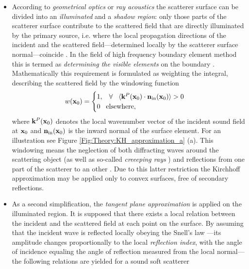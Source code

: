 \begin{itemize}
%
\item According to \emph{geometrical optics} or \emph{ray acoustics} the scatterer surface can be divided into an \emph{illuminated} and a \emph{shadow region}: only those parts of the scatterer surface contribute to the scattered field that are directly illuminated by the primary source, i.e. where the local propagation directions of the incident and the scattered field---determined locally by the scatterer surface normal---coincide \cite{doi:10.1121/1.1916538}.
In the field of high frequency boundary element method this is termed as \emph{determining the visible elements} on the boundary \cite{Herrin2003}.
Mathematically this requirement is formulated as weighting the integral, describing the scattered field by the windowing function
\begin{equation}
w(\mathbf{x}_0) = \begin{cases}
                        1, \hspace{3mm} \forall \hspace{3mm} \langle \mathbf{k}^P(\mathbf{x}_0) \cdot \mathbf{n}_{\mathrm{in}}(\mathbf{x}_0) \rangle > 0 \\
                        0  \hspace{3mm} \text{elsewhere},
                    \end{cases}
\label{eq:theory:windowing_function}
\end{equation}
where $\mathbf{k}^P(\mathbf{x}_0)$ denotes the local wavenumber vector of the incident sound field at $\mathbf{x}_0$ and $ \mathbf{n}_{\mathrm{in}}(\mathbf{x}_0)$ is the inward normal of the surface element. 
For an illustration see Figure \ref{Fig:Theory:KH_approximation_a} (a).
%
This windowing means the neglection of both diffracting waves around the scattering object (as well as so-called \emph{creeeping rays} \cite{Bleistein1984}) and reflections from one part of the scatterer to an other \cite{Pignier2015}. 
Due to this latter restriction the Kirchhoff approximation may be applied only to convex surfaces, free of secondary reflections.
%
\item As a second simplification, the \emph{tangent plane approximation} is applied on the illuminated region.
It is supposed that there exists a local relation between the incident and the scattered field at each point on the surface.
By assuming that the incident wave is reflected locally obeying the Snell's law  \cite{Voronich2007}---its amplitude changes proportionally to the local \emph{reflection index}, with the angle of incidence equaling the angle of reflection measured from the local normal---the following relations are yielded for a sound soft scatterer \cite{Bleistein1984, Bleistein2000, Pike2002}

\end{itemize}

